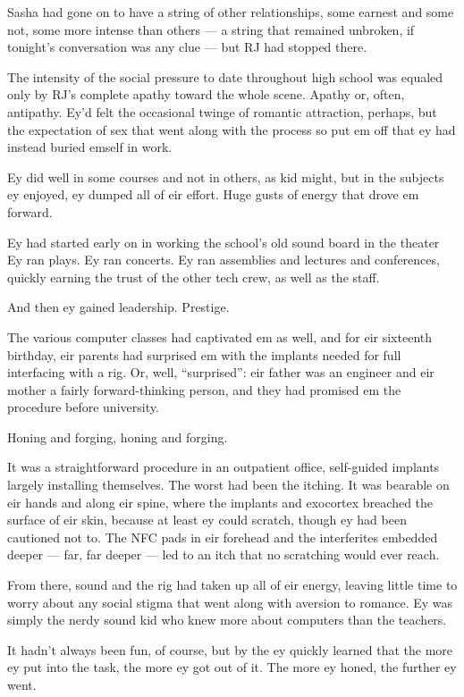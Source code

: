 Sasha had gone on to have a string of other relationships, some earnest and some not, some more intense than others — a string that remained unbroken, if tonight's conversation was any clue — but RJ had stopped there.

The intensity of the social pressure to date throughout high school was equaled only by RJ's complete apathy toward the whole scene. Apathy or, often, antipathy. Ey'd felt the occasional twinge of romantic attraction, perhaps, but the expectation of sex that went along with the process so put em off that ey had instead buried emself in work.

Ey did well in some courses and not in others, as kid might, but in the subjects ey enjoyed, ey dumped all of eir effort. Huge gusts of energy that drove em forward.

Ey had started early on in working the school's old sound board in the theater Ey ran plays. Ey ran concerts. Ey ran assemblies and lectures and conferences, quickly earning the trust of the other tech crew, as well as the staff.

And then ey gained leadership. Prestige.

The various computer classes had captivated em as well, and for eir sixteenth birthday, eir parents had surprised em with the implants needed for full interfacing with a rig. Or, well, ``surprised'': eir father was an engineer and eir mother a fairly forward-thinking person, and they had promised em the procedure before university.

Honing and forging, honing and forging.

It was a straightforward procedure in an outpatient office, self-guided implants largely installing themselves. The worst had been the itching. It was bearable on eir hands and along eir spine, where the implants and exocortex breached the surface of eir skin, because at least ey could scratch, though ey had been cautioned not to. The NFC pads in eir forehead and the interferites embedded deeper — far, far deeper — led to an itch that no scratching would ever reach.

From there, sound and the rig had taken up all of eir energy, leaving little time to worry about any social stigma that went along with aversion to romance. Ey was simply the nerdy sound kid who knew more about computers than the teachers.

It hadn't always been fun, of course, but by the ey quickly learned that the more ey put into the task, the more ey got out of it. The more ey honed, the further ey went.

